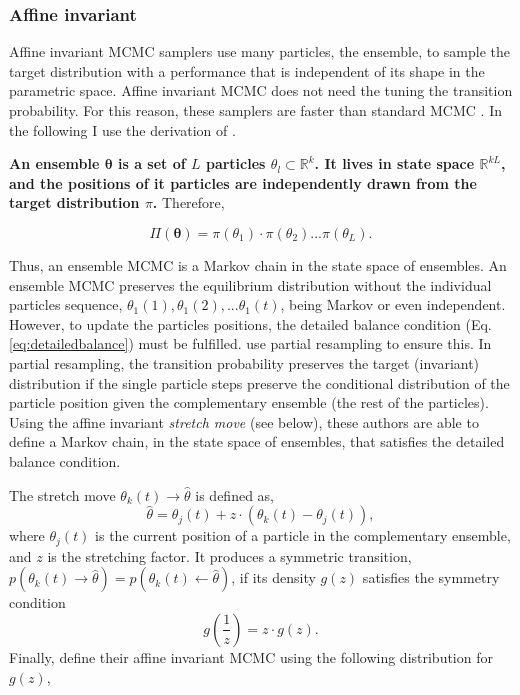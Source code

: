 \subsubsection{Affine invariant}
Affine invariant MCMC samplers use many particles, the ensemble, to sample the target distribution with a performance that is independent of its shape in the parametric space. Affine invariant MCMC does not need the tuning the transition probability. For this reason, these samplers are faster than standard MCMC \citep{Goodman2010}. In the following I use the derivation of \citet{Goodman2010}.


\textbf{An ensemble $\boldsymbol{\theta}$ is a set of $L$ particles $\theta_l \subset \mathbb{R}^k$. It lives in state space $\mathbb{R}^{kL}$, and the positions of it particles are independently drawn from the target distribution $\pi$.} Therefore,

\begin{equation}
\Pi(\boldsymbol{\theta})=\pi(\theta_1)\cdot\pi(\theta_2)...\pi(\theta_L).\nonumber 
\end{equation}

Thus, an ensemble MCMC is a Markov chain in the state space of ensembles. An ensemble MCMC preserves the equilibrium distribution without the individual particles sequence, $\theta_1(1),\theta_1(2),...\theta_1(t)$, being Markov or even independent. However, to update the particles positions, the detailed balance condition (Eq. \ref{eq:detailedbalance}) must be fulfilled. \citet{Goodman2010} use partial resampling to ensure this. In partial resampling, the transition probability preserves the target (invariant) distribution if the single particle steps preserve the conditional distribution of the particle position given the complementary ensemble (the rest of the particles). Using the affine invariant \emph{stretch move} (see below), these authors are able to define a Markov chain, in the state space of ensembles, that satisfies the detailed balance condition. 

The stretch move $\theta_k(t) \rightarrow \hat{\theta}$ is defined as,
\begin{equation}
\label{eq:stretchmove}
\hat{\theta}= \theta_j(t) + z\cdot(\theta_k(t)-\theta_j(t)),\nonumber 
\end{equation}
where $\theta_j(t)$ is the current position of a particle in the complementary ensemble, and $z$ is the stretching factor. It produces a symmetric transition, $p(\theta_k(t) \rightarrow \hat{\theta})=p(\theta_k(t) \leftarrow \hat{\theta})$, if its density $g(z)$ satisfies the symmetry condition
\begin{equation}
g(\frac{1}{z})= z\cdot g(z).\nonumber 
\end{equation}
Finally, \citet{Goodman2010} define their affine invariant MCMC using the following distribution for $g(z)$,

